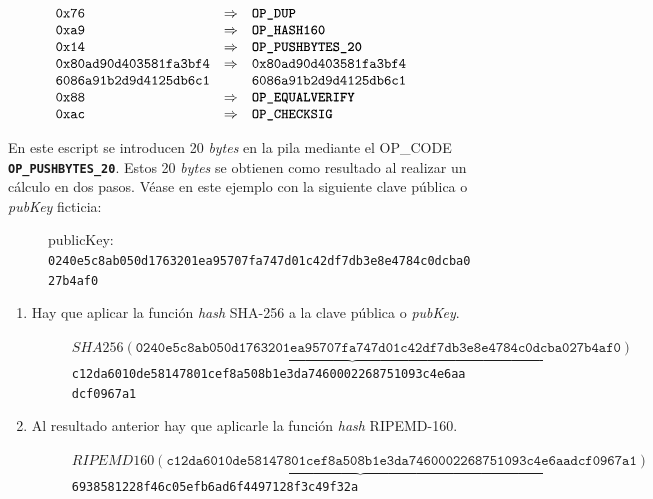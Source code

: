 \documentclass{article}
\begin{document}
    \begin{figure}[H]
        $\begin{array}{lcl}
            \texttt{0x76} & \Rightarrow & \textbf{\texttt{OP\_DUP}} \\
            \texttt{0xa9} & \Rightarrow & \textbf{\texttt{OP\_HASH160}}\\
            \texttt{0x14} & \Rightarrow & \textbf{\texttt{OP\_PUSHBYTES\_20}} \\
            \texttt{0x80ad90d403581fa3bf4} & \Rightarrow & \texttt{0x80ad90d403581fa3bf4} \\
            \texttt{6086a91b2d9d4125db6c1} & & \texttt{6086a91b2d9d4125db6c1} \\
            \texttt{0x88} & \Rightarrow & \textbf{\texttt{OP\_EQUALVERIFY}} \\
            \texttt{0xac} & \Rightarrow & \textbf{\texttt{OP\_CHECKSIG}}
        \end{array}$
    \end{figure}
    En este escript se introducen 20 \textit{bytes} en la pila mediante el OP\_CODE \textbf{\texttt{OP\_PUSHBYTES\_20}}. Estos 20 \textit{bytes} se obtienen como resultado al realizar un cálculo en dos pasos. Véase en este ejemplo con la siguiente clave pública o \textit{pubKey} ficticia:
    
    \begin{figure}[H]
    \centering
        \scriptsize{publicKey: \texttt{0240e5c8ab050d1763201ea95707fa747d01c42df7db3e8e4784c0dcba027b4af0}}
    \end{figure}
    
    \begin{enumerate}
        \item Hay que aplicar la función \textit{hash} SHA-256 a la clave pública o \textit{pubKey}.
        \begin{figure}[H]
        \centering
            \scriptsize{$\underbrace{SHA256(\texttt{0240e5c8ab050d1763201ea95707fa747d01c42df7db3e8e4784c0dcba027b4af0})}$ \\
            \texttt{c12da6010de58147801cef8a508b1e3da7460002268751093c4e6aadcf0967a1}}
        \end{figure}
        
        \item Al resultado anterior hay que aplicarle la función \textit{hash} RIPEMD-160.
        \begin{figure}[H]
        \centering
            \scriptsize{$\underbrace{RIPEMD160(\texttt{c12da6010de58147801cef8a508b1e3da7460002268751093c4e6aadcf0967a1})}$ \\
            \texttt{6938581228f46c05efb6ad6f4497128f3c49f32a}}
        \end{figure}
    \end{enumerate}
    
\end{document}
